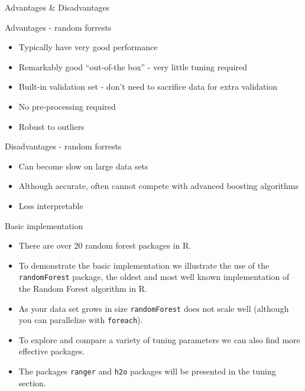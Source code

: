 \documentclass[10pt,ignorenonframetext,]{beamer}
\providecommand{\tightlist}{%
  \setlength{\itemsep}{0pt}\setlength{\parskip}{0pt}}
\begin{document}
\begin{frame}{Advantages \& Disadvantages}

\begin{block}{Advantages - random forrests}

\begin{itemize}
\tightlist
\item
  Typically have very good performance
\item
  Remarkably good ``out-of-the box'' - very little tuning required
\item
  Built-in validation set - don't need to sacrifice data for extra
  validation
\item
  No pre-processing required
\item
  Robust to outliers
\end{itemize}

\end{block}

\begin{block}{Disadvantages - random forrests}

\begin{itemize}
\tightlist
\item
  Can become slow on large data sets
\item
  Although accurate, often cannot compete with advanced boosting
  algorithms
\item
  Less interpretable
\end{itemize}

\end{block}

\end{frame}

\begin{frame}[fragile]{Basic implementation}

\begin{itemize}
\tightlist
\item
  There are over 20 random forest packages in R.
\item
  To demonstrate the basic implementation we illustrate the use of the
  \texttt{randomForest} package, the oldest and most well known
  implementation of the Random Forest algorithm in R.
\item
  As your data set grows in size \texttt{randomForest} does not scale
  well (although you can parallelize with \texttt{foreach}).
\item
  To explore and compare a variety of tuning parameters we can also find
  more effective packages.
\item
  The packages \texttt{ranger} and \texttt{h2o} packages will be
  presented in the tuning section.
\end{itemize}

\end{frame}
\end{document}
